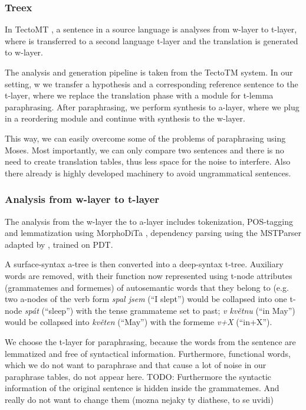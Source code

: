 \documentclass[11pt]{article}
\begin{document}
\subsubsection{Treex}
In TectoMT \cite{tectomt}, a sentence in a source language is analyses from 
w-layer to t-layer, where is transferred to a second language t-layer and the 
translation is generated to w-layer. 

The analysis and generation pipeline is taken from the TectoTM system. In our 
setting, w we transfer a hypothesis and a corresponding reference sentence to 
the t-layer, where we replace the translation phase with a module for t-lemma 
paraphrasing. After paraphrasing, we perform synthesis to a-layer, where we 
plug in a reordering module and continue with synthesis to the w-layer. 

This way, we can easily overcome some of the problems of paraphrasing using 
Moses. Most importantly, we can only compare two sentences and there is no need 
to create translation tables, thus less space for the noise to interfere. Also 
there already is highly developed machinery to avoid ungrammatical sentences. 

\subsubsection{Analysis from w-layer to t-layer}
The analysis from the w-layer the to a-layer includes tokenization, POS-tagging
and lemmatization using MorphoDiTa \cite{morphodita}, dependency parsing using
the MSTParser \cite{McDonald:2005} adapted by , trained on
PDT.

A surface-syntax a-tree is then converted into a deep-syntax t-tree. Auxiliary 
words are removed, with their function now represented using t-node attributes 
(grammatemes and formemes) of autosemantic words that they belong to (e.g. two
a-nodes of the verb form \textit{spal jsem} (``I slept'') would be collapsed 
into one t-node \textit{spát} (``sleep'') with the tense grammateme set to 
past; \textit{v květnu} (``in May'') would be collapsed into \textit{květen} 
(``May'') with the formeme \textit{v+X} (``in+X'').

We choose the t-layer for paraphrasing, because the words from the sentence 
are lemmatized and free of syntactical information. Furthermore, functional 
words, which we do not want to paraphrase and that cause a lot of noise in our 
paraphrase tables, do not appear here.
TODO: Furthermore the syntactic information of the original sentence is hidden
inside the grammatemes. And really do not want to change them (mozna nejaky
ty diathese, to se uvidi)
\end{document}
